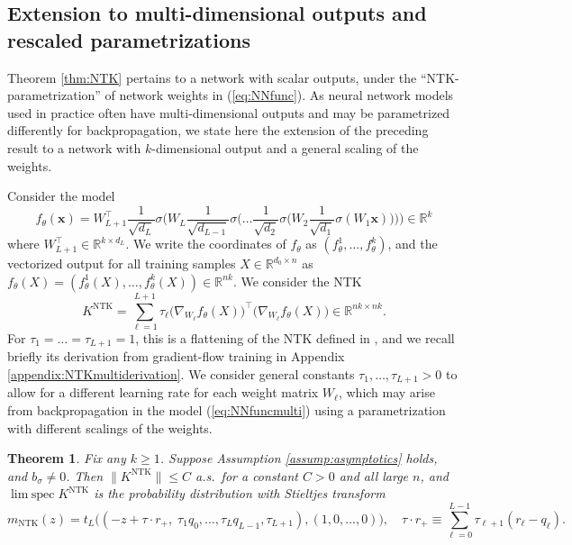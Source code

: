 \documentclass{article}
\newtheorem{theorem}{Theorem}[section]
\theoremstyle{definition}
\newcommand{\R}{\mathbb{R}}
\newcommand{\NTK}{\text{NTK}}
\newcommand{\x}{\mathbf{x}}
\newcommand{\1}{\mathbf{1}}
\newcommand{\limspec}{\operatorname{lim\;spec}}
\begin{document}
\subsection{Extension to multi-dimensional outputs and rescaled
parametrizations}\label{sec:extensions}

Theorem \ref{thm:NTK} pertains to a network with scalar outputs,
under the ``NTK-parametrization'' of network weights in (\ref{eq:NNfunc}). As
neural network models used in practice often have multi-dimensional outputs and
may be parametrized differently for backpropagation, we state here the
extension of the preceding result to a network with $k$-dimensional output and a
general scaling of the weights.

Consider the model
\begin{equation}\label{eq:NNfuncmulti}
f_\theta(\x)=W_{L+1}^\top \frac{1}{\sqrt{d_L}} \sigma\bigg(
W_L \frac{1}{\sqrt{d_{L-1}}}\sigma \Big(\ldots
\frac{1}{\sqrt{d_2}}\sigma\Big(W_2\frac{1}{\sqrt{d_1}} \sigma(W_1 \x)
\Big)\Big)\bigg) \in \R^k
\end{equation}
where $W_{L+1}^\top \in \R^{k \times d_L}$. We write the coordinates of
$f_\theta$ as $(f_\theta^1,\ldots,f_\theta^k)$, and the vectorized output
for all training samples $X \in \R^{d_0 \times n}$ as
$f_\theta(X)=(f_\theta^1(X),\ldots,f_\theta^k(X)) \in \R^{nk}$. We consider
the NTK
\begin{equation}\label{eq:NTKmulti}
K^\NTK=\sum_{\ell=1}^{L+1}
\tau_\ell \Big(\nabla_{W_\ell} f_\theta(X)\Big)^\top
\Big(\nabla_{W_\ell} f_\theta(X)\Big) \in \R^{nk \times nk}.
\end{equation}
For $\tau_1=\ldots=\tau_{L+1}=1$, this is a flattening of the NTK
defined in \cite{jacot2018neural}, and we recall briefly its derivation 
from gradient-flow training in Appendix \ref{appendix:NTKmultiderivation}.
We consider general constants $\tau_1,\ldots,\tau_{L+1}>0$ to allow for
a different learning rate for each weight matrix $W_\ell$, which may arise from
backpropagation in the model (\ref{eq:NNfuncmulti}) using a
parametrization with different scalings of the weights.

\begin{theorem}\label{thm:NTKmulti}
Fix any $k \geq 1$. Suppose Assumption \ref{assump:asymptotics} holds, and $b_\sigma \neq 0$. Then $\|K^\NTK\| \leq C$ a.s.\ for a constant $C>0$
and all large $n$, and $\limspec K^\NTK$ is the probability
distribution with Stieltjes transform
\[m_\NTK(z)=t_L\Big((-z+\tau \cdot r_+,\;\tau_1q_0,\ldots,\tau_Lq_{L-1},\tau_{L+1}),(1,0,\ldots,0)\Big),
\quad \tau \cdot r_+ \equiv \sum_{\ell=0}^{L-1} \tau_{\ell+1}(r_\ell-q_\ell).\]
\end{theorem}
\end{document}
